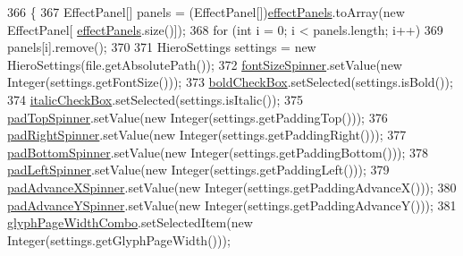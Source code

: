 \begin{DoxyCode}
366                                                 \{
367         EffectPanel[] panels = (EffectPanel[])\mbox{\hyperlink{classorg_1_1newdawn_1_1slick_1_1tools_1_1hiero_1_1_hiero_a84dc85d78d9ad7b44e24e045b0a0cd84}{effectPanels}}.toArray(\textcolor{keyword}{new} EffectPanel[
      \mbox{\hyperlink{classorg_1_1newdawn_1_1slick_1_1tools_1_1hiero_1_1_hiero_a84dc85d78d9ad7b44e24e045b0a0cd84}{effectPanels}}.size()]);
368         \textcolor{keywordflow}{for} (\textcolor{keywordtype}{int} i = 0; i < panels.length; i++)
369             panels[i].\textcolor{keyword}{remove}();
370 
371         HieroSettings settings = \textcolor{keyword}{new} HieroSettings(file.getAbsolutePath());
372         \mbox{\hyperlink{classorg_1_1newdawn_1_1slick_1_1tools_1_1hiero_1_1_hiero_ad5c1f797cd6441f6df9618124e3d6d77}{fontSizeSpinner}}.setValue(\textcolor{keyword}{new} Integer(settings.getFontSize()));
373         \mbox{\hyperlink{classorg_1_1newdawn_1_1slick_1_1tools_1_1hiero_1_1_hiero_a605e35729a7fd5437c5fa9692cd44c74}{boldCheckBox}}.setSelected(settings.isBold());
374         \mbox{\hyperlink{classorg_1_1newdawn_1_1slick_1_1tools_1_1hiero_1_1_hiero_a4c571b425b96934d5298ae39b155db87}{italicCheckBox}}.setSelected(settings.isItalic());
375         \mbox{\hyperlink{classorg_1_1newdawn_1_1slick_1_1tools_1_1hiero_1_1_hiero_a10d07901d4b2d2729d228eb329ff873a}{padTopSpinner}}.setValue(\textcolor{keyword}{new} Integer(settings.getPaddingTop()));
376         \mbox{\hyperlink{classorg_1_1newdawn_1_1slick_1_1tools_1_1hiero_1_1_hiero_a2c0741d232f9cd9054bdb82cc9d0c8b3}{padRightSpinner}}.setValue(\textcolor{keyword}{new} Integer(settings.getPaddingRight()));
377         \mbox{\hyperlink{classorg_1_1newdawn_1_1slick_1_1tools_1_1hiero_1_1_hiero_ad1d65973a4b07eaa6b4e8f6638fa6d1b}{padBottomSpinner}}.setValue(\textcolor{keyword}{new} Integer(settings.getPaddingBottom()));
378         \mbox{\hyperlink{classorg_1_1newdawn_1_1slick_1_1tools_1_1hiero_1_1_hiero_a2396ca8d40bd31d5ccafc3bfa683eb6d}{padLeftSpinner}}.setValue(\textcolor{keyword}{new} Integer(settings.getPaddingLeft()));
379         \mbox{\hyperlink{classorg_1_1newdawn_1_1slick_1_1tools_1_1hiero_1_1_hiero_afd022869253bd23ee0daf1f0f06966ae}{padAdvanceXSpinner}}.setValue(\textcolor{keyword}{new} Integer(settings.getPaddingAdvanceX()));
380         \mbox{\hyperlink{classorg_1_1newdawn_1_1slick_1_1tools_1_1hiero_1_1_hiero_a5d9233b804a0a3506880e5ff43dddcad}{padAdvanceYSpinner}}.setValue(\textcolor{keyword}{new} Integer(settings.getPaddingAdvanceY()));
381         \mbox{\hyperlink{classorg_1_1newdawn_1_1slick_1_1tools_1_1hiero_1_1_hiero_a27e8ebe1ca05ea8252bf38dc2bb73b02}{glyphPageWidthCombo}}.setSelectedItem(\textcolor{keyword}{new} Integer(settings.getGlyphPageWidth()));

\end{DoxyCode}
